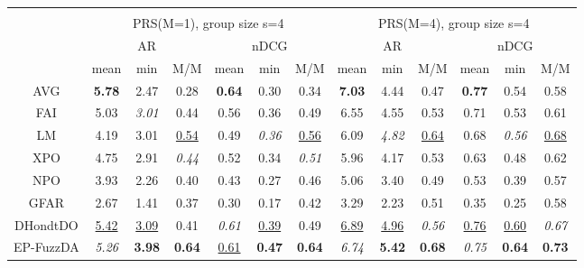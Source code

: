 \begin{tabular}{ c | c c c | c c c || c c c | c c c}
\multicolumn{12}{c}{} \\
\multicolumn{1}{c}{} & \multicolumn{6}{c}{PRS(M=1), group size s=4} & \multicolumn{6}{c}{PRS(M=4), group size s=4} \\
\multicolumn{1}{c}{} & \multicolumn{3}{c}{AR} & \multicolumn{3}{c}{nDCG} & \multicolumn{3}{c}{AR} & \multicolumn{3}{c}{nDCG} \\
& mean & min & M/M & mean & min & M/M & mean & min & M/M & mean & min & M/M \\
\hline
AVG & \textbf{5.78} & 2.47 & 0.28 & \textbf{0.64} & 0.30 & 0.34 & \textbf{7.03} & 4.44 & 0.47 & \textbf{0.77} & 0.54 & 0.58 \\
FAI & 5.03 & \textit{3.01} & 0.44 & 0.56 & 0.36 & 0.49 & 6.55 & 4.55 & 0.53 & 0.71 & 0.53 & 0.61 \\
LM & 4.19 & 3.01 & \underline{0.54} & 0.49 & \textit{0.36} & \underline{0.56} & 6.09 & \textit{4.82} & \underline{0.64} & 0.68 & \textit{0.56} & \underline{0.68} \\
XPO & 4.75 & 2.91 & \textit{0.44} & 0.52 & 0.34 & \textit{0.51} & 5.96 & 4.17 & 0.53 & 0.63 & 0.48 & 0.62 \\
NPO & 3.93 & 2.26 & 0.40 & 0.43 & 0.27 & 0.46 & 5.06 & 3.40 & 0.49 & 0.53 & 0.39 & 0.57 \\
GFAR & 2.67 & 1.41 & 0.37 & 0.30 & 0.17 & 0.42 & 3.29 & 2.23 & 0.51 & 0.35 & 0.25 & 0.58 \\
DHondtDO & \underline{5.42} & \underline{3.09} & 0.41 & \textit{0.61} & \underline{0.39} & 0.49 & \underline{6.89} & \underline{4.96} & \textit{0.56} & \underline{0.76} & \underline{0.60} & \textit{0.67} \\
EP-FuzzDA & \textit{5.26} & \textbf{3.98} & \textbf{0.64} & \underline{0.61} & \textbf{0.47} & \textbf{0.64} & \textit{6.74} & \textbf{5.42} & \textbf{0.68} & \textit{0.75} & \textbf{0.64} & \textbf{0.73} \\


\end{tabular}
